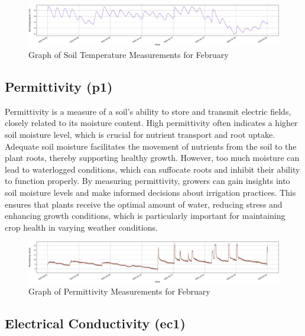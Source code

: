\begin{figure}[htbp]
    \centering
    \includegraphics[width=15 cm]{4_ChapterMaterials/figuras/train_data_Soil_temperature.pdf}
    \caption{Graph of Soil Temperature Measurements for February}
    \end{figure}

\subsection{Permittivity (p1)}

Permittivity is a measure of a soil's ability to store and transmit electric fields, closely related to its moisture content. High permittivity often indicates a higher soil moisture level, which is crucial for nutrient transport and root uptake. Adequate soil moisture facilitates the movement of nutrients from the soil to the plant roots, thereby supporting healthy growth. However, too much moisture can lead to waterlogged conditions, which can suffocate roots and inhibit their ability to function properly. By measuring permittivity, growers can gain insights into soil moisture levels and make informed decisions about irrigation practices. This ensures that plants receive the optimal amount of water, reducing stress and enhancing growth conditions, which is particularly important for maintaining crop health in varying weather conditions.

\begin{figure}[htbp]
    \centering
    \includegraphics[width=15 cm]{4_ChapterMaterials/figuras/train_data_Permittivity.pdf}
    \caption{Graph of Permittivity Measurements for February}
    \end{figure}

\subsection{Electrical Conductivity (ec1)}

